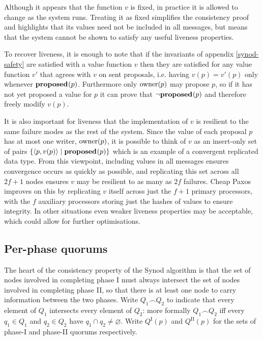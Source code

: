 \documentclass[journal]{IEEEtran}
\begin{document}
Although it appears that the function $v$ is fixed, in practice it is allowed
to change as the system runs. Treating it as fixed simplifies the consistency
proof and highlights that its values need not be included in all messages, but
means that the system cannot be shown to satisfy any useful liveness
properties.

To recover liveness, it is enough to note that if the invariants of appendix
\ref{synod-safety} are satisfied with a value function $v$ then they are
satisfied for any value function $v'$ that agrees with $v$ on sent proposals,
i.e. having $v(p) = v'(p)$ only whenever $\mathbf{proposed}_{}(p)$.  Furthermore only
$\mathrm{owner}(p)$ may propose $p$, so if it has not yet proposed a value for $p$ it
can prove that $\neg\mathbf{proposed}_{}(p)$ and therefore freely modify $v(p)$.

It is also important for liveness that the implementation of $v$ is resilient
to the same failure modes as the rest of the system. Since the value of each
proposal $p$ has at most one writer, $\mathrm{owner}(p)$, it is possible to think of
$v$ as an insert-only set of pairs ${\{ \langle p, v(p) \rangle \mid \mathbf{proposed}_{}(p)
\}}$ which is an example of a convergent replicated data type\cite{crdts}.
From this viewpoint, including values in all messages ensures convergence
occurs as quickly as possible, and replicating this set across all ${2f+1}$
nodes ensures $v$ may be resilient to as many as $2f$ failures. Cheap Paxos
improves on this by replicating $v$ itself across just the ${f+1}$ primary
processors, with the $f$ auxiliary processors storing just the hashes of values
to ensure integrity.  In other situations even weaker liveness properties may
be acceptable, which could allow for further optimisations.

\subsection{Per-phase quorums}\label{per-phase-quorums}

The heart of the consistency property of the Synod algorithm is that the set of
nodes involved in completing phase I must always intersect the set of nodes
involved in completing phase II, so that there is at least one node to carry
information between the two phases. Write $Q_1 \frown Q_2$ to indicate that
every element of $Q_1$ intersects every element of $Q_2$: more formally $Q_1
\frown Q_2$ iff every $q_1 \in Q_1$ and $q_2 \in Q_2$ have ${q_1 \cap q_2 \ne
\varnothing}$. Write $Q^\textrm{I}(p)$ and $Q^\textrm{II}(p)$ for the sets of
phase-I and phase-II quorums respectively.
\end{document}
